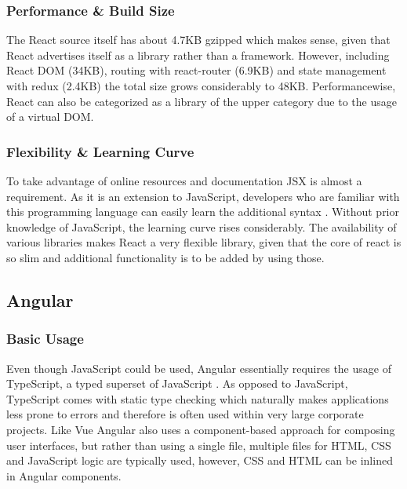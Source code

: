 \subsubsection{Performance \& Build Size}
The React source itself has about 4.7KB gzipped which makes sense, given that React advertises itself as a library rather than a framework. However, including React DOM (34KB), routing with react-router (6.9KB) and state management with redux (2.4KB) the total size grows considerably to 48KB. Performancewise, React can also be categorized as a library of the upper category \cite{FrameworksPerformance:online} due to the usage of a virtual DOM.

\subsubsection{Flexibility \& Learning Curve}
To take advantage of online resources and documentation JSX is almost a requirement. As it is an extension to JavaScript, developers who are familiar with this programming language can easily learn the additional syntax \cite{ReactJSX:online}. Without prior knowledge of JavaScript, the learning curve rises considerably. The availability of various libraries makes React a very flexible library, given that the core of react is so slim and additional functionality is to be added by using those. 


\subsection{Angular}

\subsubsection{Basic Usage}
Even though JavaScript could be used, Angular essentially requires the usage of TypeScript, a typed superset of JavaScript \cite{TypeScript:online}. As opposed to JavaScript, TypeScript comes with static type checking which naturally makes applications less prone to errors \cite{DynamicallyTypedLanguages:proceedings} and therefore is often used within very large corporate projects. Like Vue Angular also uses a component-based approach for composing user interfaces, but rather than using a single file, multiple files for HTML, CSS and JavaScript logic are typically used, however, CSS and HTML can be inlined in Angular components.  \newline

